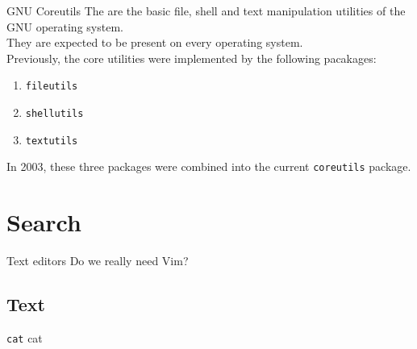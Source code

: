 \documentclass[11pt]{beamer}
\begin{document}
		\begin{frame}{GNU Coreutils}
				The {\color{blue}{GNU Core Utilities}} are the basic file, shell and text manipulation utilities of the GNU operating system. \\
				They are expected to be present on every operating system. \\
				Previously, the core utilities were implemented by the following pacakages:
				\begin{enumerate}
				  \item \texttt{fileutils} 
				  \item \texttt{shellutils} 
				  \item \texttt{textutils}
				\end{enumerate}	
				In 2003, these three packages were combined into the current \texttt{coreutils} package.
		\end{frame}
	
	\section{Search}
		\begin{frame}{Text editors}
			Do we really need Vim?	
		\end{frame}
		\subsection{Text}
			\begin{frame}{\texttt{cat}}
				cat
			\end{frame}
\end{document}
